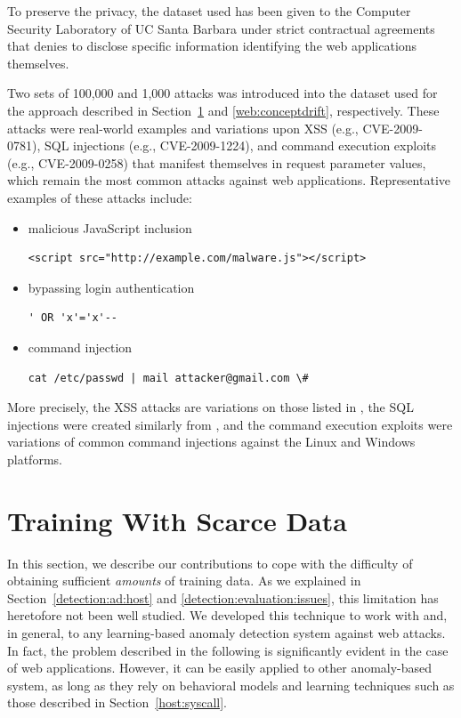 \begin{note}
  To preserve the privacy, the dataset used has been given to the Computer Security Laboratory of UC Santa Barbara under strict contractual agreements that denies to disclose specific information identifying the web applications themselves.
\end{note}

Two sets of 100,000 and 1,000 attacks was introduced into the dataset used for the approach described in Section~\ref{web:longtail} and \ref{web:conceptdrift}, respectively. These attacks were real-world examples and variations upon \ac{XSS} (e.g., CVE-2009-0781), \ac{SQL} injections (e.g., CVE-2009-1224), and command execution exploits (e.g., CVE-2009-0258) that manifest themselves in request parameter values, which remain the most common attacks against web applications. Representative examples of these attacks include:

\begin{itemize}
\item malicious JavaScript inclusion
\begin{lstlisting}[numbers=none]
  <script src="http://example.com/malware.js"></script>
\end{lstlisting}
\item bypassing login authentication
\begin{lstlisting}[numbers=none]
  ' OR 'x'='x'--
\end{lstlisting}
\item command injection
\begin{lstlisting}[numbers=none]
  cat /etc/passwd | mail attacker@gmail.com \#
\end{lstlisting}

\end{itemize}

More precisely, the \ac{XSS} attacks are variations on those listed in \citep{xss_cheat_sheet}, the \ac{SQL} injections were created similarly from \citep{sqli_cheat_sheet}, and the command execution exploits were variations of common command injections against the \textsf{Linux} and \textsf{Windows} platforms.

\section{Training With Scarce Data}
\label{web:longtail}
In this section, we describe our contributions \citep{2009_robertson_maggi_kruegel_vigna} to cope with the difficulty of obtaining sufficient \emph{amounts} of training data. As we explained in Section~\ref{detection:ad:host} and \ref{detection:evaluation:issues}, this limitation has heretofore not been well studied. We developed this technique to work with \webanomaly and, in general, to any learning-based anomaly detection system against web attacks. In fact, the problem described in the following is significantly evident in the case of web applications. However, it can be easily applied to other anomaly-based system, as long as they rely on behavioral models and learning techniques such as those described in Section~\ref{host:syscall}.


